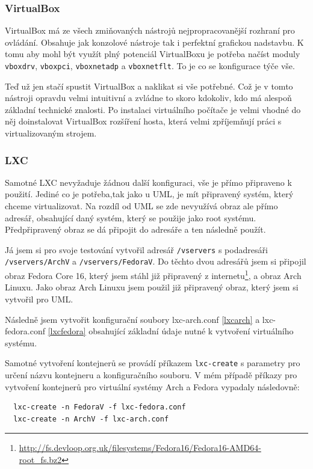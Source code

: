\subsubsection{VirtualBox}
VirtualBox má ze všech zmiňovaných nástrojů nejpropracovanější rozhraní pro ovládání. Obsahuje jak konzolové nástroje tak i perfektní grafickou nadstavbu. K tomu aby mohl být využít plný potenciál VirtualBoxu je potřeba načíst moduly \texttt{vboxdrv}, \texttt{vboxpci}, \texttt{vboxnetadp} a \texttt{vboxnetflt}. To je co se konfigurace týče vše.

Teď už jen stačí spustit VirtualBox a naklikat si vše potřebné. Což je v tomto nástroji opravdu velmi intuitivní a zvládne to skoro kdokoliv, kdo má alespoň základní technické znalosti. Po instalaci virtuálního počítače je velmi vhodné do něj doinstalovat VirtualBox rozšíření hosta, která velmi zpříjemňují práci s virtualizovaným strojem.
\subsubsection{LXC}
Samotné LXC nevyžaduje žádnou další konfiguraci, vše je přímo připraveno k použití. Jediné co je potřeba,tak jako u UML, je mít připravený systém, který chceme virtualizovat. Na rozdíl od UML se zde nevyužívá obraz ale přímo adresář, obsahující daný systém, který se použije jako root systému. Předpřipravený obraz se dá připojit do adresáře a ten následně použít.

Já jsem si pro svoje testování vytvořil adresář \texttt{/vservers} s podadresáři \texttt{/vservers/ArchV} a \texttt{/vservers/FedoraV}. Do těchto dvou adresářů jsem si připojil obraz Fedora Core 16, který jsem stáhl již připravený z internetu\footnote{\url{http://fs.devloop.org.uk/filesystems/Fedora16/Fedora16-AMD64-root_fs.bz2}}, a obraz Arch Linuxu. Jako obraz Arch Linuxu jsem použil již připravený obraz, který jsem si vytvořil pro UML.

Následně jsem vytvořit konfigurační soubory lxc-arch.conf \ref{lxcarch} a lxc-fedora.conf \ref{lxcfedora} obsahující základní údaje nutné k vytvoření virtuálního systému.

Samotné vytvoření kontejnerů se provádí příkazem \texttt{lxc-create} s parametry pro určení názvu kontejneru a konfiguračního souboru. V mém případě příkazy pro vytvoření kontejnerů pro virtuální systémy Arch a Fedora vypadaly následovně:
\begin{verbatim}
  lxc-create -n FedoraV -f lxc-fedora.conf
  lxc-create -n ArchV -f lxc-arch.conf
\end{verbatim}

